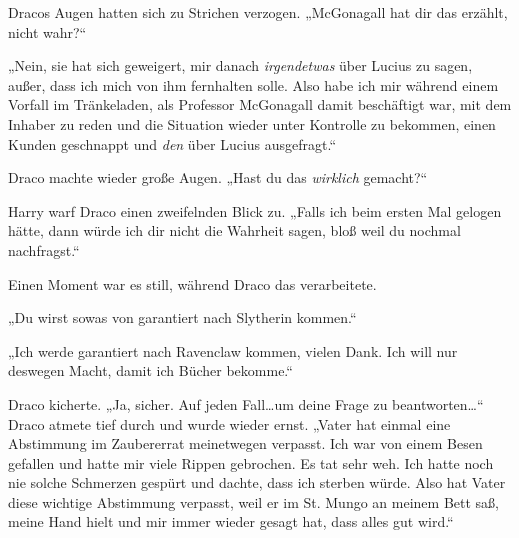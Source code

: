 Dracos Augen hatten sich zu Strichen verzogen. „McGonagall hat dir das erzählt, nicht wahr?“

„Nein, sie hat sich geweigert, mir danach \emph{irgendetwas} über Lucius zu sagen, außer, dass ich mich von ihm fernhalten solle. Also habe ich mir während einem Vorfall im Tränkeladen, als Professor McGonagall damit beschäftigt war, mit dem Inhaber zu reden und die Situation wieder unter Kontrolle zu bekommen, einen Kunden geschnappt und \emph{den} über Lucius ausgefragt.“

Draco machte wieder große Augen. „Hast du das \emph{wirklich} gemacht?“

Harry warf Draco einen zweifelnden Blick zu. „Falls ich beim ersten Mal gelogen hätte, dann würde ich dir nicht die Wahrheit sagen, bloß weil du nochmal nachfragst.“

Einen Moment war es still, während Draco das verarbeitete.

„Du wirst sowas von garantiert nach Slytherin kommen.“

„Ich werde garantiert nach Ravenclaw kommen, vielen Dank. Ich will nur deswegen Macht, damit ich Bücher bekomme.“

Draco kicherte. „Ja, sicher. Auf jeden Fall…um deine Frage zu beantworten…“ Draco atmete tief durch und wurde wieder ernst. „Vater hat einmal eine Abstimmung im Zaubererrat meinetwegen verpasst. Ich war von einem Besen gefallen und hatte mir viele Rippen gebrochen. Es tat sehr weh. Ich hatte noch nie solche Schmerzen gespürt und dachte, dass ich sterben würde. Also hat Vater diese wichtige Abstimmung verpasst, weil er im St. Mungo an meinem Bett saß, meine Hand hielt und mir immer wieder gesagt hat, dass alles gut wird.“

